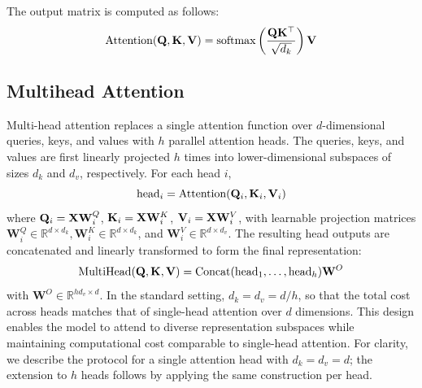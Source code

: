 \documentclass[sigconf,anonymous,review,balance=false]{acmart}
\begin{document}
The output matrix is computed as follows:
\[
    \text{Attention} ({\mathbf{Q}}, {\mathbf{K}}, {\mathbf{V}} ) = {\mathrm{softmax}}\left(\frac{{\mathbf{Q}}{\mathbf{K}}^\top}{\sqrt{d_k}}\right){\mathbf{V}}
\]


\subsection{Multihead Attention}

Multi-head attention replaces a single attention function over $d$-dimensional queries, keys, and values with $h$ parallel attention heads. The queries, keys, and values are first linearly projected $h$ times into lower-dimensional subspaces of sizes $d_k$ and $d_v$, respectively. For each head $i$,
\[
    \text{head}_i = \text{Attention} ({\mathbf{Q}}_i, {\mathbf{K}}_i, {\mathbf{V}}_i)
\]
where ${\mathbf{Q}}_i = {\mathbf{X}} \mathbf{W}_i^{Q}$, ${\mathbf{K}}_i = {\mathbf{X}} \mathbf{W}_i^{K}$, ${\mathbf{V}}_i = {\mathbf{X}} \mathbf{W}_i^{V}$, with learnable projection matrices $\mathbf{W}_i^{Q} \in \mathbb{R}^{d\times d_k}, \mathbf{W}_i^{K} \in \mathbb{R}^{d\times d_k}$, and $\mathbf{W}_i^{V} \in \mathbb{R}^{d\times d_v}$.
The resulting head outputs are concatenated and linearly transformed to form the final representation:
\[
\text{MultiHead}({\mathbf{Q}},{\mathbf{K}},{\mathbf{V}})=\text{Concat} (\text{head}_1,\dots,\text{head}_h) \mathbf{W}^{O}
\]
with $\mathbf{W}^{O} \in \mathbb{R}^{h d_v \times d}$.
In the standard setting, $d_k = d_v = d/h$, so that the total cost across heads matches that of single-head attention over $d$ dimensions. This design enables the model to attend to diverse representation subspaces while maintaining computational cost comparable to single-head attention. For clarity, we describe the protocol for a single attention head with $d_k = d_v = d$; the extension to $h$ heads follows by applying the same construction per head.
\end{document}
